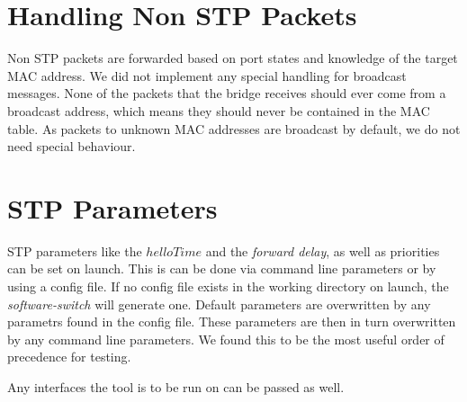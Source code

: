 \section{Handling Non STP Packets}
Non STP packets are forwarded based on port states and knowledge of the target MAC address.
We did not implement any special handling for broadcast messages.
None of the packets that the bridge receives should ever come from a broadcast address, which means they should never be contained in the MAC table.
As packets to unknown MAC addresses are broadcast by default, we do not need special behaviour.


\section{STP Parameters}
STP parameters like the $helloTime$ and the \textit{forward delay}, as well as priorities can be set on launch.
This is can be done via command line parameters or by using a config file.
If no config file exists in the working directory on launch, the \textit{software-switch} will generate one.
Default parameters are overwritten by any parametrs found in the config file.
These parameters are then in turn overwritten by any command line parameters.
We found this to be the most useful order of precedence for testing.

Any interfaces the tool is to be run on can be passed as well.
